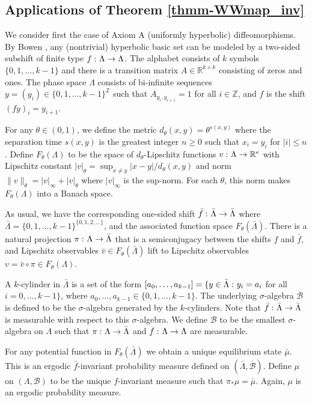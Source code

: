 \documentclass[aop,MSNbibl,seceqn,dvips]{arximspdf}
\newcommand{\R}{\mathbb{R}}
\newcommand{\Z}{\mathbb{Z}}
\begin{document}
\subsection{Applications of Theorem \texorpdfstring{\protect\ref{thmm-WWmap_inv}}{5.2}}

We consider first the case of
Axiom A (uniformly hyperbolic) diffeomorphisms.
By Bowen \cite{Bowen75}, any (nontrivial) hyperbolic basic set can be
modeled by a two-sided subshift of finite type $f\dvtx\Lambda\to
\Lambda$.
The alphabet consists of $k$ symbols $\{0,1,\ldots,k-1\}$ and there is a
transition matrix $A\in\R^{k\times k}$ consisting of zeros and ones.
The phase space $\Lambda$ consists of bi-infinite sequences
$y=(y_i)\in
\{0,1,\ldots,k-1\}^\Z$ such that $A_{y_i,y_{i+1}}=1$ for all $i\in\Z
$, and
$f$ is the shift $(fy)_i=y_{i+1}$.

For any $\theta\in(0,1)$, we define the metric $d_\theta(x,y)=\theta
^{s(x,y)}$
where the separation time $s(x,y)$ is the greatest integer $n\ge0$
such that
$x_i=y_i$ for $|i|\le n$.
Define $F_\theta(\Lambda)$ to be the space of $d_\theta$-Lipschitz functions
$v\dvtx\Lambda\to\R^e$ with Lipschitz constant $|v|_\theta=\sup_{x\neq
y}|x-y|/d_\theta(x,y)$ and norm $\|v\|_\theta=|v|_\infty+|v|_\theta$
where $|v|_\infty$ is the sup-norm. For each $\theta$, this norm makes
$F_\theta(\Lambda)$ into a Banach space.

As usual, we have the corresponding one-sided shift $\bar f\dvtx\bar
\Lambda
\to\bar\Lambda$
where $\bar\Lambda=\{0,1,\ldots,k-1\}^{\{0,1,2,\ldots\}}$, and the
associated function space
$F_\theta(\bar\Lambda)$. There is a natural projection $\pi\dvtx
\Lambda\to
\bar\Lambda$ that is a semiconjugacy between the shifts $f$ and $\bar
f$, and Lipschitz
observables $\bar v\in F_\theta(\bar\Lambda)$ lift to Lipschitz
observables $v=\bar v\circ\pi\in F_\theta(\Lambda)$.

A $k$-cylinder in $\bar\Lambda$ is a set of the form
$[a_0,\ldots,a_{k-1}]=\{y\in\bar\Lambda\dvtx y_i=a_i$ for all
$i=0,\ldots,k-1\}$, where $a_0,\ldots,a_{k-1}\in\{0,1,\ldots,k-1\}$.
The underlying $\sigma$-algebra $\overline{\mathcal{B}}$ is defined to
be the
$\sigma$-algebra generated by the $k$-cylinders. Note that $\bar{f}\dvtx
\bar
\Lambda\to\bar\Lambda$
is measurable with respect to this $\sigma$-algebra.
We define $\mathcal{B}$ to be the smallest $\sigma$-algebra on
$\Lambda$
such that $\pi\dvtx\Lambda\to\bar\Lambda$ and $f\dvtx\Lambda\to
\Lambda$ are measurable.

For any potential function in $F_\theta(\bar\Lambda)$ we obtain a
unique equilibrium state $\bar\mu$. This is an ergodic $\bar{f}$-invariant
probability measure defined on $(\bar\Lambda,\overline{\mathcal{B}})$.
Define $\mu$ on $(\Lambda,\mathcal{B})$ to be the unique
$f$-invariant measure such that $\pi_*\mu=\bar\mu$. Again,
$\mu$ is an ergodic probability measure.
\end{document}
